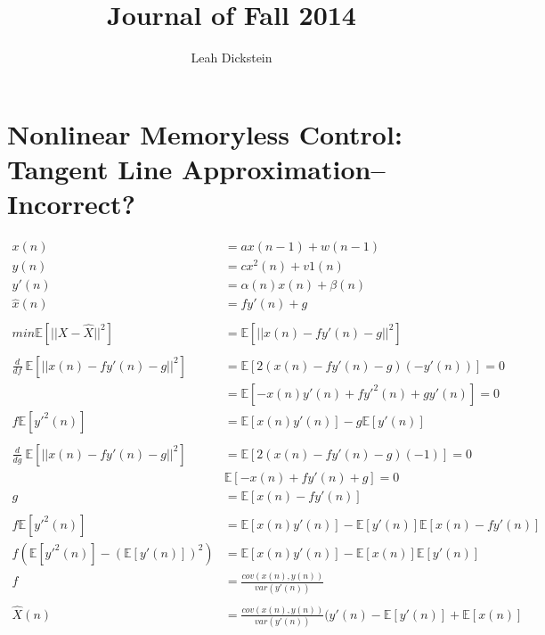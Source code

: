\documentclass[leqno,twocolumn]{article}
\begin{document}
\onecolumn
\title{Journal of Fall 2014}
\author{Leah Dickstein}

\maketitle

\tableofcontents

\section{Nonlinear Memoryless Control: Tangent Line Approximation--Incorrect?}

\begin{align*}
x(n) &= ax(n-1) + w(n-1)\\
y(n) &= cx^2(n) + v1(n)\\
y'(n) &= \alpha(n) x(n) + \beta(n) \\
\hat{x}(n) &= fy'(n) + g\\
{} \\
min \mathbb{E}[||X - \hat{X}||^2] &= \mathbb{E}[||x(n) - fy'(n) - g||^2]\\
{} \\
\frac{d}{df} \: \mathbb{E}[||x(n) - fy'(n) - g||^2] &= \mathbb{E}[2(x(n) - fy'(n) - g)(-y'(n))] = 0\\
&= \mathbb{E}[-x(n)y'(n) + fy'^2(n) + gy'(n)] = 0\\
f\mathbb{E}[y'^2(n)] &= \mathbb{E}[x(n)y'(n)] - g\mathbb{E}[y'(n)]\\
{} \\
\frac{d}{dg} \: \mathbb{E}[||x(n) - fy'(n) - g||^2] &= \mathbb{E}[2(x(n) - fy'(n) - g)(-1)] = 0\\
& \mathbb{E}[-x(n) + fy'(n) + g] = 0\\
g &= \mathbb{E}[x(n) - fy'(n)]\\
{} \\
f \mathbb{E}[y'^2(n)] &= \mathbb{E}[x(n)y'(n)] - \mathbb{E}[y'(n)] \mathbb{E}[x(n) - fy'(n)] \\
f (\mathbb{E}[y'^2(n)] - (\mathbb{E}[y'(n)])^2 ) &= \mathbb{E}[x(n)y'(n)] - \mathbb{E}[x(n)] \mathbb{E}[y'(n)] \\
f &= \frac{cov(x(n), y(n) )}{var(y'(n))}\\
{} \\
\hat{X}(n) &= \frac{cov(x(n), y(n) )}{var(y'(n))} (y'(n) - \mathbb{E}[y'(n)] + \mathbb{E}[x(n)]
\end{align*}
\end{document}
